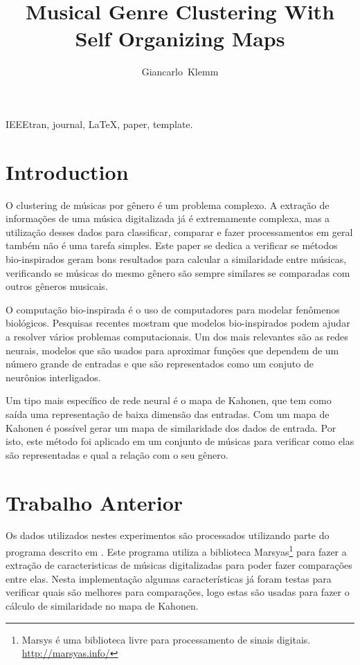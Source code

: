 \documentclass[journal]{IEEEtran}
\begin{document}
\title{Musical Genre Clustering With Self Organizing Maps}
\author{Giancarlo~Klemm}%

\maketitle

\begin{abstract}
\blindtext[1]
\end{abstract}

\begin{IEEEkeywords}
IEEEtran, journal, \LaTeX, paper, template.
\end{IEEEkeywords}

\section{Introduction}
O clustering de músicas por gênero é um problema complexo. A extração de informações de uma música digitalizada já é extremamente complexa, mas a utilização desses dados para classificar, comparar e fazer processamentos em geral também não é uma tarefa simples. Este paper se dedica a verificar se métodos bio-inspirados geram bons resultados para calcular a similaridade entre músicas, verificando se músicas do mesmo gênero são sempre similares se comparadas com outros gêneros musicais.

O computação bio-inspirada é o uso de computadores para modelar fenômenos biológicos. Pesquisas recentes mostram que modelos bio-inspirados podem ajudar a resolver vários problemas computacionais. Um dos mais relevantes são as redes neurais, modelos que são usados para aproximar funções que dependem de um número grande de entradas e que são representados como um conjuto de neurônios interligados.

Um tipo mais específico de rede neural é o mapa de Kahonen, que tem como saída uma representação de baixa dimensão das entradas. Com um mapa de Kahonen é possível gerar um mapa de similaridade dos dados de entrada. Por isto, este método foi aplicado em um conjunto de músicas para verificar como elas são representadas e qual a relação com o seu gênero.
	
\section{Trabalho Anterior}
Os dados utilizados nestes experimentos são processados utilizando parte do programa descrito em \cite{meshup}. Este programa utiliza a biblioteca Marsyas\footnote{Marsys é uma biblioteca livre para processamento de sinais digitais. \href{http://marsyas.info/}{http://marsyas.info/}} para fazer a extração de caracteristicas de músicas digitalizadas para poder fazer comparações entre elas. Nesta implementação algumas características já foram testas para verificar quais são melhores para comparações, logo estas são usadas para fazer o cálculo de similaridade no mapa de Kahonen.
\end{document}
